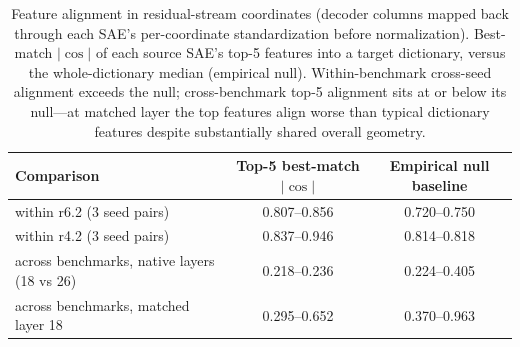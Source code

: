 \begin{table}[htbp]
\caption{Feature alignment in residual-stream coordinates (decoder columns mapped back through each SAE's per-coordinate standardization before normalization). Best-match $|\cos|$ of each source SAE's top-5 features into a target dictionary, versus the whole-dictionary median (empirical null). Within-benchmark cross-seed alignment exceeds the null; cross-benchmark top-5 alignment sits at or below its null---at matched layer the top features align worse than typical dictionary features despite substantially shared overall geometry.}
\label{tab:alignment}
\centering
\small
\begin{tabular}{lcc}
\toprule
Comparison & Top-5 best-match $|\cos|$ & Empirical null baseline \\
\midrule
within r6.2 (3 seed pairs) & 0.807--0.856 & 0.720--0.750 \\
within r4.2 (3 seed pairs) & 0.837--0.946 & 0.814--0.818 \\
across benchmarks, native layers (18 vs 26) & 0.218--0.236 & 0.224--0.405 \\
across benchmarks, matched layer 18 & 0.295--0.652 & 0.370--0.963 \\
\bottomrule
\end{tabular}
\end{table}
